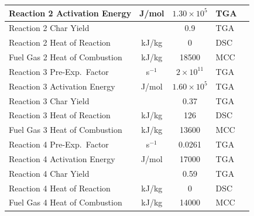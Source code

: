 \begin{longtable}{@{\extracolsep{\fill}}|l|c|c|l|l|}
Reaction 2 Activation Energy	  & J/mol	      & $1.30\times 10^5$                       & TGA	                                    & \cite{McKinnon:CF2013}                \\ \hline
Reaction 2 Char Yield	 	      &               & 0.9	                                    & TGA	                                    & \cite{McKinnon:CF2013}                \\ \hline
Reaction 2 Heat of Reaction       & kJ/kg	      & 0                                       & DSC	                                    & \cite{McKinnon:CF2013}                \\ \hline
Fuel Gas 2 Heat of Combustion     & kJ/kg	      & 18500	                                & MCC	                                    & \cite{McKinnon:CF2013}                \\ \hline
Reaction 3 Pre-Exp.~Factor        & s$^{-1}$	  & $2\times 10^{11}$                   	& TGA                                       & \cite{McKinnon:CF2013}                \\ \hline
Reaction 3 Activation Energy	  & J/mol	      & $1.60\times 10^5$	                    & TGA	                                    & \cite{McKinnon:CF2013}                \\ \hline
Reaction 3 Char Yield	 	      &               & 0.37	                                & TGA	                                    & \cite{McKinnon:CF2013}                \\ \hline
Reaction 3 Heat of Reaction	      & kJ/kg	      & 126                                 	& DSC                                       & \cite{McKinnon:CF2013}                \\ \hline
Fuel Gas 3 Heat of Combustion     & kJ/kg	      & 13600	                                & MCC	                                    & \cite{McKinnon:CF2013}                \\ \hline
Reaction 4 Pre-Exp.~Factor        & s$^{-1}$	  & 0.0261	                                & TGA	                                    & \cite{McKinnon:CF2013}                \\ \hline
Reaction 4 Activation Energy	  & J/mol	      & 17000	                                & TGA                                       & \cite{McKinnon:CF2013}                \\ \hline
Reaction 4 Char Yield	 	      &               & 0.59	                                & TGA                                       & \cite{McKinnon:CF2013}                \\ \hline
Reaction 4 Heat of Reaction	      & kJ/kg	      & 0                                       & DSC	                                    & \cite{McKinnon:CF2013}                \\ \hline
Fuel Gas 4 Heat of Combustion     & kJ/kg	      & 14000                               	& MCC                                       & \cite{McKinnon:CF2013}                \\ \hline
\end{longtable}


